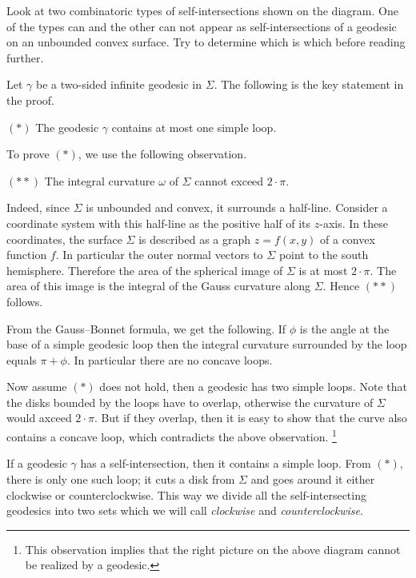 Look at two combinatoric types of self-intersections shown on the diagram.
One of the types can and the other can not appear as self-intersections of a geodesic on an unbounded convex surface.
Try to determine which is which before reading further.

\medskip

Let $\gamma$ be a two-sided infinite geodesic in $\Sigma$.
The following is the key statement in the proof.

\begin{cl}{$({*})$}
The geodesic $\gamma$ contains at most one simple loop.
\end{cl}

To prove $({*})$, we use the following observation.

\begin{cl}{$({*}{*})$}
The integral curvature $\omega$ of $\Sigma$ cannot exceed $2\cdot\pi$.
\end{cl}

Indeed, since $\Sigma$ is unbounded and convex,
it surrounds a half-line.
Consider a coordinate system with this half-line as the positive half of its $z$-axis. 
In these coordinates, the surface $\Sigma$ is described as a graph $z=f(x,y)$ of a convex function $f$.
In particular the outer normal vectors to $\Sigma$ point to the south hemisphere.
Therefore the area of the spherical image of $\Sigma$ is at most $2\cdot\pi$.
The area of this image is the integral of the Gauss curvature along $\Sigma$. 
Hence $({*}{*})$ follows.

From the Gauss--Bonnet formula, we get the following.
If $\phi$ is the angle at the base of a simple geodesic loop then the integral curvature surrounded by the loop equals $\pi+\phi$. 
In particular there are no concave loops.

Now assume $({*})$ does not hold, then a geodesic has two simple loops.
Note that the disks bounded by the loops  have to overlap,
otherwise the curvature of $\Sigma$ would axceed $2\cdot\pi$.
But if they overlap, then it is easy to show that the curve also contains a concave loop, 
which contradicts the above observation.%
\footnote{This observation implies that the right picture on the above diagram cannot be realized by a geodesic.}

If a geodesic $\gamma$ has a self-intersection,
then it contains a simple loop.
From $({*})$, there is only one such loop;
it cuts a disk from $\Sigma$ 
and goes around it either clockwise or counterclockwise.
This way we divide all the self-intersecting geodesics 
into two sets which we will call {}\emph{clockwise} and {}\emph{counterclockwise}.

